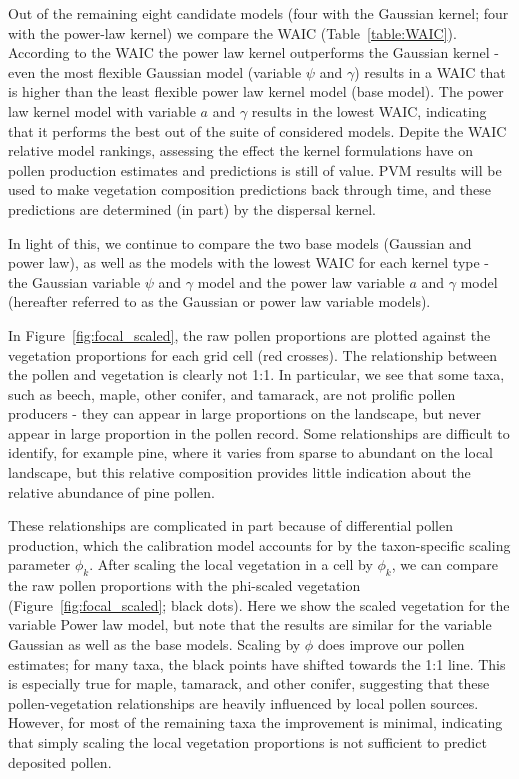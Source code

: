 \documentclass[12pt]{article}
\begin{document}
Out of the remaining eight candidate models (four with the Gaussian
kernel; four with the power-law kernel) we compare the WAIC
(Table~\ref{table:WAIC}). According to the WAIC the power law kernel
outperforms the Gaussian kernel - even the most flexible Gaussian
model (variable $\psi$ and $\gamma$) results in a WAIC that is higher
than the least flexible power law kernel model (base model). The power
law kernel model with variable $a$ and $\gamma$ results in the lowest
WAIC, indicating that it performs the best out of the suite of
considered models. Depite the WAIC relative model rankings, assessing
the effect the kernel formulations have on pollen production estimates
and predictions is still of value. PVM results will be used to make
vegetation composition predictions back through time, and these
predictions are determined (in part) by the dispersal kernel.

In light of this, we continue to compare the two base models (Gaussian
and power law), as well as the models with the lowest WAIC for each
kernel type - the Gaussian variable $\psi$ and $\gamma$ model and the
power law variable $a$ and $\gamma$ model (hereafter referred to as
the Gaussian or power law variable models).

In Figure~\ref{fig:focal_scaled}, the raw pollen proportions are
plotted against the vegetation proportions for each grid cell (red
crosses). The relationship between the pollen and vegetation is
clearly not 1:1. In particular, we see that some taxa, such as beech,
maple, other conifer, and tamarack, are not prolific pollen producers
- they can appear in large proportions on the landscape, but never
appear in large proportion in the pollen record. Some relationships
are difficult to identify, for example pine, where it varies from
sparse to abundant on the local landscape, but this relative
composition provides little indication about the relative abundance of
pine pollen.

These relationships are complicated in part because of differential
pollen production, which the calibration model accounts for by the
taxon-specific scaling parameter $\phi_k$. After scaling the local
vegetation in a cell by $\phi_k$, we can compare the raw pollen
proportions with the phi-scaled vegetation
(Figure~\ref{fig:focal_scaled}; black dots). Here we show the scaled
vegetation for the variable Power law model, but note that the results
are similar for the variable Gaussian as well as the base
models. Scaling by $\phi$ does improve our pollen estimates; for many
taxa, the black points have shifted towards the 1:1 line. This is
especially true for maple, tamarack, and other conifer, suggesting
that these pollen-vegetation relationships are heavily influenced by
local pollen sources. However, for most of the remaining taxa the
improvement is minimal, indicating that simply scaling the local
vegetation proportions is not sufficient to predict deposited pollen.
\end{document}
